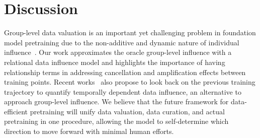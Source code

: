 \section{Discussion}



Group-level data valuation is an important yet challenging problem in foundation model pretraining due to the non-additive and dynamic nature of individual influence~\cite{grosse2023studyinginfluence,hu2024most}. Our work approximates the oracle group-level influence with a relational data influence model and highlights the importance of having relationship terms in addressing cancellation and amplification effects between training points. Recent works~\cite{wang2024capturing} also propose to look back on the previous training trajectory to quantify temporally dependent data influence, an alternative to approach group-level influence. We believe that the future framework for data-efficient pretraining will unify data valuation, data curation, and actual pretraining in one procedure, allowing the model to self-determine which direction to move forward with minimal human efforts.